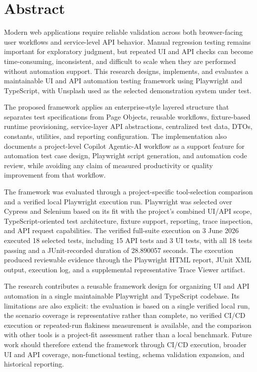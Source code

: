 \chapter*{Abstract}

Modern web applications require reliable validation across both browser-facing user workflows and service-level API behavior. Manual regression testing remains important for exploratory judgment, but repeated UI and API checks can become time-consuming, inconsistent, and difficult to scale when they are performed without automation support. This research designs, implements, and evaluates a maintainable UI and API automation testing framework using Playwright and TypeScript, with Unsplash used as the selected demonstration system under test.

The proposed framework applies an enterprise-style layered structure that separates test specifications from Page Objects, reusable workflows, fixture-based runtime provisioning, service-layer API abstractions, centralized test data, DTOs, constants, utilities, and reporting configuration. The implementation also documents a project-level Copilot Agentic-AI workflow as a support feature for automation test case design, Playwright script generation, and automation code review, while avoiding any claim of measured productivity or quality improvement from that workflow.

The framework was evaluated through a project-specific tool-selection comparison and a verified local Playwright execution run. Playwright was selected over Cypress and Selenium based on its fit with the project's combined UI/API scope, TypeScript-oriented test architecture, fixture support, reporting, trace inspection, and API request capabilities. The verified full-suite execution on 3 June 2026 executed 18 selected tests, including 15 API tests and 3 UI tests, with all 18 tests passing and a JUnit-recorded duration of 28.890057 seconds. The execution produced reviewable evidence through the Playwright HTML report, JUnit XML output, execution log, and a supplemental representative Trace Viewer artifact.

The research contributes a reusable framework design for organizing UI and API automation in a single maintainable Playwright and TypeScript codebase. Its limitations are also explicit: the evaluation is based on a single verified local run, the scenario coverage is representative rather than complete, no verified CI/CD execution or repeated-run flakiness measurement is available, and the comparison with other tools is a project-fit assessment rather than a local benchmark. Future work should therefore extend the framework through CI/CD execution, broader UI and API coverage, non-functional testing, schema validation expansion, and historical reporting.
